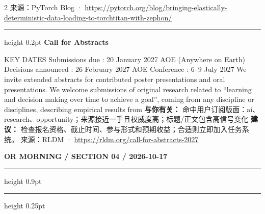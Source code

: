 \documentclass[10.5pt]{ctexart}
\begin{document}
\begin{multicols}{2}
{\footnotesize\color{ormuted} 来源：PyTorch Blog · \url{https://pytorch.org/blog/bringing-elastically-deterministic-data-loading-to-torchtitan-with-zephon/}}
\vspace{2mm}
\hrule height 0.2pt
\vspace{2mm}
{\large\bfseries Call for Abstracts}\par
KEY DATES Submissions due : 20 January 2027 AOE (Anywhere on Earth) Decisions announced : 26 February 2027 AOE Conference : 6–9 July 2027 We invite extended abstracts for contributed poster presentations and oral presentations. We welcome submissions of original research related to “learning and decision making over time to achieve a goal”, coming from any discipline or disciplines, describing empirical results from 
\textbf{与你有关：} 命中用户订阅版面：ai、research、opportunity；来源接近一手且权威度高；标题/正文包含高信号变化
\textbf{建议：} 检查报名资格、截止时间、参与形式和预期收益；合适则立即加入任务系统。
{\footnotesize\color{ormuted} 来源：RLDM · \url{https://rldm.org/call-for-abstracts-2027}}
\end{multicols}
\newpage
{\small\bfseries OR MORNING / SECTION 04 / 2026-10-17}
\vspace{2mm}
\hrule height 0.9pt
\vspace{1.5mm}
\hrule height 0.25pt
\vspace{4mm}
\end{document}
